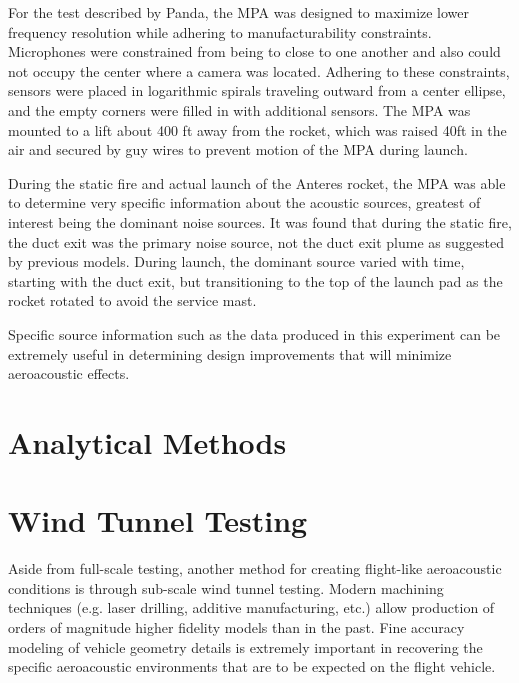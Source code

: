 \documentclass[]{aiaa-tc}%
\begin{document}
For the test described by Panda, the MPA was designed to maximize lower frequency resolution while adhering to manufacturability constraints.  Microphones were constrained from being to close to one another and also could not occupy the center where a camera was located.  Adhering to these constraints, sensors were placed in logarithmic spirals traveling outward from a center ellipse, and the empty corners were filled in with additional sensors.  The MPA was mounted to a lift about 400 ft away from the rocket, which was raised 40ft in the air and secured by guy wires to prevent motion of the MPA during launch.

During the static fire and actual launch of the Anteres rocket, the MPA was able to determine very specific information about the acoustic sources, greatest of interest being the dominant noise sources.  It was found that during the static fire, the duct exit was the primary noise source, not the duct exit plume as suggested by previous models.  During launch, the dominant source varied with time, starting with the duct exit, but transitioning to the top of the launch pad as the rocket rotated to avoid the service mast.

Specific source information such as the data produced in this experiment can be extremely useful in determining design improvements that will minimize aeroacoustic effects.






\section{Analytical Methods}




\section{Wind Tunnel Testing}

Aside from full-scale testing, another method for creating flight-like aeroacoustic conditions is through sub-scale wind tunnel testing.  Modern machining techniques (e.g. laser drilling, additive manufacturing, etc.)\cite{SLSAscentWTT} allow production of orders of magnitude higher fidelity models than in the past.  Fine accuracy modeling of vehicle geometry details is extremely important in recovering the specific aeroacoustic environments that are to be expected on the flight vehicle.
\end{document}

